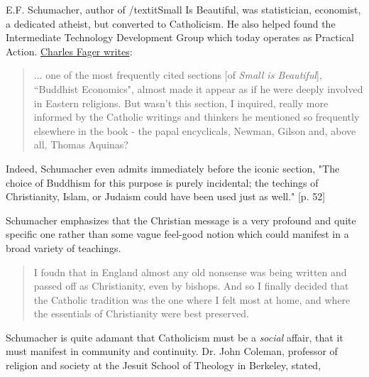 
E.F. Schumacher, author of /textit{Small Is Beautiful}, was statistician, economist, a dedicated atheist, but converted to Catholicism. He also helped found the Intermediate Technology Development Group which today operates as Practical Action. \href{https://www.religion-online.org/article/small-is-beautiful-and-so-is-rome-surprising-faith-of-e-f-schumacher/}{Charles Fager writes}:

\begin{quote}
... one of the most frequently cited sections [of \textit{Small is Beautiful}], ``Buddhist Economics", almost made it appear as if he were deeply involved in Eastern religions. But wasn't this section, I inquired, really more informed by the Catholic writings and thinkers he mentioned so frequently elsewhere in the book - the papal encyclicals, Newman, Gilson and, above all, Thomas Aquinas?
\end{quote}

Indeed, Schumacher even admits immediately before the iconic section, "The choice of Buddhism for this purpose is purely incidental; the techings of Christianity, Islam, or Judaism could have been used just as well." [p. 52]


Schumacher emphasizes that the Christian message is a very profound and quite specific one rather than some vague feel-good notion which could manifest in a broad variety of teachings.

\begin{quote}
I foudn that in England almost any old nonsense was being written and passed off as Christianity, even by bishops. And so I finally decided that the Catholic tradition was the one where I felt most at home, and where the essentials of Christianity were best preserved.
\end{quote}

Schumacher is quite adamant that Catholicism must be a \textit{social} affair, that it must manifest in community and continuity. Dr. John Coleman, professor of religion and society at the Jesuit School of Theology in Berkeley, stated,

